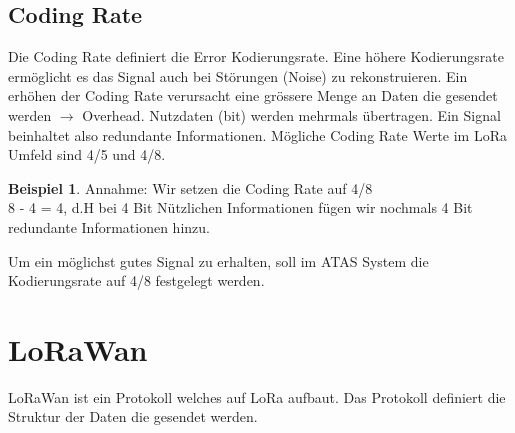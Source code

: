 \documentclass[11pt,english,german]{report}
\theoremstyle{definition}
\newtheorem{exmp}{Beispiel}[subsection]
\begin{document}
\subsection{Coding Rate}
Die Coding Rate definiert die Error Kodierungsrate. Eine höhere Kodierungsrate ermöglicht es das Signal auch bei Störungen (Noise) zu rekonstruieren. Ein erhöhen der Coding Rate verursacht eine grössere Menge an Daten die gesendet werden $\rightarrow$ Overhead. Nutzdaten (bit) werden mehrmals übertragen. Ein Signal beinhaltet also redundante Informationen. Mögliche Coding Rate Werte im LoRa Umfeld sind 4/5 und 4/8.
\begin{exmp}
	Annahme: Wir setzen die Coding Rate auf 4/8\\
	8 - 4 = 4, d.H bei 4 Bit Nützlichen Informationen fügen wir nochmals 4 Bit redundante Informationen hinzu.
\end{exmp}
\noindent
Um ein möglichst gutes Signal zu erhalten, soll im ATAS System die Kodierungsrate auf 4/8 festgelegt werden.

\newpage
\section{LoRaWan}
LoRaWan ist ein Protokoll welches auf LoRa aufbaut. Das Protokoll definiert die Struktur der Daten die gesendet werden.
\end{document}
